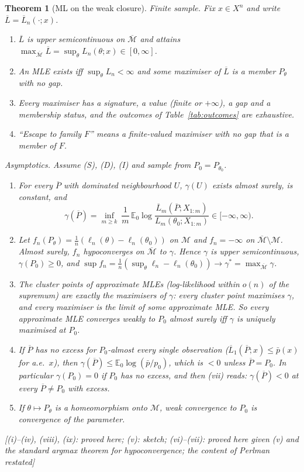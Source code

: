 \documentclass[11pt]{article}
\newcommand{\E}{\mathbb E}
\newcommand{\cM}{\mathcal M}
\newcommand{\bM}{\overline{\mathcal M}}
\newcommand{\bP}{\overline P}
\newcommand{\bL}{\overline L}
\newcommand{\status}[1]{\textsf{[#1]}}
\newtheorem{theorem}{Theorem}
\theoremstyle{definition}
\theoremstyle{remark}
\begin{document}
\begin{theorem}[ML on the weak closure]\label{thm:main}
\emph{Finite sample.} Fix $x\in X^n$ and write $\bL=\bL_n(\cdot;x)$.
\begin{enumerate}
\item[(i)] $\bL$ is upper semicontinuous on $\bM$ and attains
  $\max_{\bM}\bL=\sup_\theta L_n(\theta;x)\in[0,\infty]$.
\item[(ii)] An MLE exists iff $\sup_\theta L_n<\infty$ and some maximiser
  of $\bL$ is a member $P_\theta$ with no gap.
\item[(iii)] Every maximiser has a signature, a value (finite or $+\infty$),
  a gap and a membership status, and the outcomes of
  Table~\ref{tab:outcomes} are exhaustive.
\item[(iv)] ``Escape to family $F$'' means a finite-valued maximiser with
  no gap that is a member of $F$.
\end{enumerate}
\emph{Asymptotics.} Assume (S), (D), (I) and sample from $P_0=P_{\theta_0}$.
\begin{enumerate}
\item[(v)] For every $\bP$ with dominated neighbourhood $U$, $\gamma(U)$ exists
  almost surely, is constant, and
  \[
   \gamma(\bP)=\inf_{m\ge k}\ \frac1m\,
   \E_0\log\frac{\bL_m(\bP;X_{1:m})}{L_m(\theta_0;X_{1:m})}
   \in[-\infty,\infty).
  \]
\item[(vi)] Let $f_n(P_\theta)=\frac1n(\ell_n(\theta)-\ell_n(\theta_0))$ on
  $\cM$ and $f_n=-\infty$ on $\bM\setminus\cM$. Almost surely, $f_n$
  hypoconverges on $\bM$ to $\gamma$. Hence $\gamma$ is upper
  semicontinuous, $\gamma(P_0)\ge0$, and
  $\sup f_n=\frac1n(\sup_\theta\ell_n-\ell_n(\theta_0))\to\gamma^*=\max_{\bM}\gamma$.
\item[(vii)] The cluster points of approximate MLEs (log-likelihood within
  $o(n)$ of the supremum) are exactly the maximisers of $\gamma$: every
  cluster point maximises $\gamma$, and every maximiser is the limit of some
  approximate MLE. So every approximate MLE converges weakly to $P_0$
  almost surely iff $\gamma$ is uniquely maximised at $P_0$.
\item[(viii)] If $\bP$ has no excess for $P_0$-almost every single
  observation ($\bL_1(\bP;x)\le\bar p(x)$ for a.e.\ $x$), then
  $\gamma(\bP)\le\E_0\log(\bar p/p_0)$, which is $<0$ unless $\bP=P_0$. In
  particular $\gamma(P_0)=0$ if $P_0$ has no excess, and then (vii) reads:
  $\gamma(\bP)<0$ at every $\bP\ne P_0$ with excess.
\item[(ix)] If $\theta\mapsto P_\theta$ is a homeomorphism onto $\cM$, weak
  convergence to $P_0$ is convergence of the parameter.
\end{enumerate}
\status{(i)--(iv), (viii), (ix): proved here; (v): sketch; (vi)--(vii):
proved here given (v) and the standard argmax theorem for hypoconvergence;
the content of Perlman \cite[Thm.~2.2(ii), Thm.~4.1]{perlman} restated}
\end{theorem}
\end{document}
